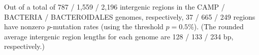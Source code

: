 Out of a total of 787 / 1,559 / 2,196 intergenic regions in the CAMP / BACTERIA / BACTEROIDALES genomes, respectively, 37 / 665 / 249 regions have nonzero $p$-mutation rates (using the threshold $p=0.5\%$). (The rounded average intergenic region lengths for each genome are 128 / 133 / 234 bp, respectively.)\endinput